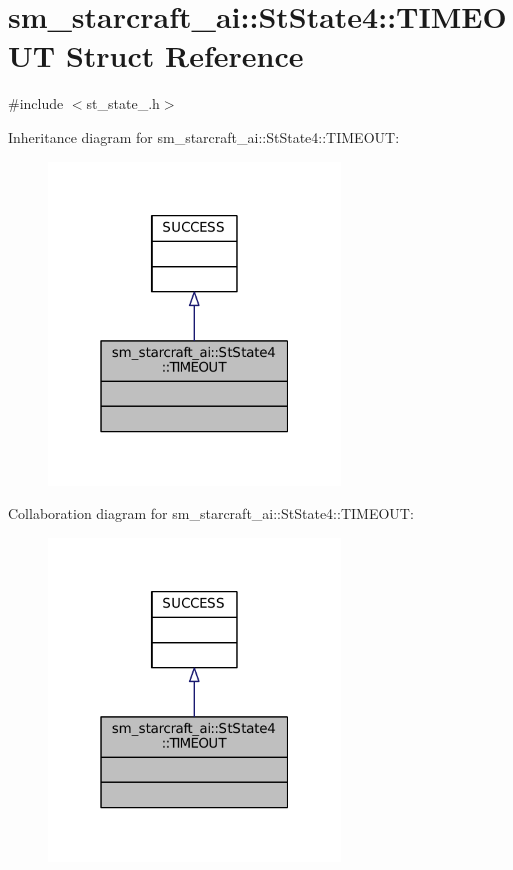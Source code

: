 \hypertarget{structsm__starcraft__ai_1_1StState4_1_1TIMEOUT}{}\section{sm\+\_\+starcraft\+\_\+ai\+:\+:St\+State4\+:\+:T\+I\+M\+E\+O\+UT Struct Reference}
\label{structsm__starcraft__ai_1_1StState4_1_1TIMEOUT}


{\ttfamily \#include $<$st\+\_\+state\+\_.\+h$>$}



Inheritance diagram for sm\+\_\+starcraft\+\_\+ai\+:\+:St\+State4\+:\+:T\+I\+M\+E\+O\+UT\+:
\nopagebreak
\begin{figure}[H]
\begin{center}
\leavevmode
\includegraphics[width=220pt]{structsm__starcraft__ai_1_1StState4_1_1TIMEOUT__inherit__graph}
\end{center}
\end{figure}


Collaboration diagram for sm\+\_\+starcraft\+\_\+ai\+:\+:St\+State4\+:\+:T\+I\+M\+E\+O\+UT\+:
\nopagebreak
\begin{figure}[H]
\begin{center}
\leavevmode
\includegraphics[width=220pt]{structsm__starcraft__ai_1_1StState4_1_1TIMEOUT__coll__graph}
\end{center}
\end{figure}


